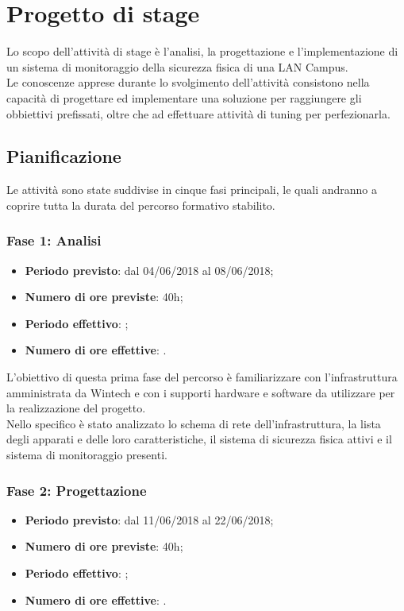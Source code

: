 \documentclass[Tesi.tex]{subfiles}
\begin{document}
\chapter{Progetto di stage}
Lo scopo dell'attività di stage è l’analisi, la progettazione e l'implementazione di un sistema di monitoraggio della sicurezza fisica di una LAN Campus. \\
Le conoscenze apprese durante lo svolgimento dell'attività consistono nella capacità di progettare ed implementare una soluzione per raggiungere gli obbiettivi prefissati, oltre che ad effettuare attività di tuning per perfezionarla.


\section{Pianificazione}
Le attività sono state suddivise in cinque fasi principali, le quali andranno a coprire tutta la durata del percorso formativo stabilito.

\subsection{Fase 1: Analisi}
\begin{itemize}
	\item \textbf{Periodo previsto}: dal 04/06/2018 al 08/06/2018;
	\item \textbf{Numero di ore previste}: 40h;
	\item \textbf{Periodo effettivo}: ;
	\item \textbf{Numero di ore effettive}: .
\end{itemize}

L'obiettivo di questa prima fase del percorso è familiarizzare con l'infrastruttura amministrata da Wintech e con i supporti hardware e software da utilizzare per la realizzazione del progetto. \\
Nello specifico è stato analizzato lo schema di rete dell'infrastruttura, la lista degli apparati e delle loro caratteristiche, il sistema di sicurezza fisica attivi e il sistema di monitoraggio presenti. 

\subsection{Fase 2: Progettazione}
\begin{itemize}
	\item \textbf{Periodo previsto}: dal 11/06/2018 al 22/06/2018;
	\item \textbf{Numero di ore previste}: 40h;
	\item \textbf{Periodo effettivo}: ;
	\item \textbf{Numero di ore effettive}: .
\end{itemize}
	
\end{document}
